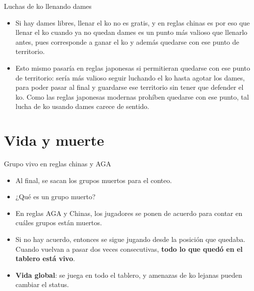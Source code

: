 \documentclass{beamer}
\begin{document}
\begin{frame}{Luchas de ko llenando dames}
  \begin{itemize}
   \item Si hay dames libres, llenar el ko no es gratis, y en reglas chinas es por eso que llenar el ko cuando ya no quedan dames es un punto más valioso que llenarlo
          antes, pues corresponde a ganar el ko y además quedarse con ese punto de territorio.
        \item Esto mismo pasaría en reglas japonesas si permitieran quedarse con ese punto de territorio: sería más valioso seguir luchando el ko hasta agotar los dames,
        para poder pasar al final y guardarse ese territorio sin tener que defender el ko. Como las reglas japonesas modernas prohíben quedarse con ese punto, tal lucha de ko
        usando dames carece de sentido.
  \end{itemize}
\end{frame}

\section{Vida y muerte}

\begin{frame}{Grupo vivo en reglas chinas y AGA}
    \begin{itemize}
        \item Al final, se sacan los grupos muertos para el conteo.
        \item ¿Qué es un grupo muerto?
        \item En reglas AGA y Chinas, los jugadores se ponen de acuerdo para contar en cuáles grupos están muertos.
        \item Si no hay acuerdo, entonces se sigue jugando desde la posición que quedaba. Cuando vuelvan a pasar dos veces consecutivas, \textbf{todo lo que quedó en el tablero está vivo}.
        \item \textbf{Vida global}: se juega en todo el tablero, y amenazas de ko lejanas pueden cambiar el status.
    \end{itemize}
    
\end{frame}
\end{document}
